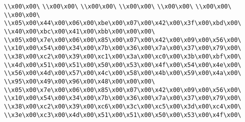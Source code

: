 \verb|\\x00\x00\|\newline
\verb|\\x00\x00\|\newline
\verb|\\x00\x00\|\newline
\verb|\\x00\x00\|\newline
\verb|\\x00\x00\|\newline
\verb|\\x00\x00\|\newline
\verb|\\x00\x00\|\newline
\verb|\\x05\x00\x44\x00\x06\x00\xbe\x00\x07\x00\x42\x00\x3f\x00\xbd\x00\|\newline
\verb|\\x40\x00\xbc\x00\x41\x00\xbb\x00\x00\x00\|\newline
\verb|\\x05\x00\x7e\x00\x06\x00\x85\x00\x07\x00\x42\x00\x09\x00\x56\x00\|\newline
\verb|\\x10\x00\x54\x00\x34\x00\x7b\x00\x36\x00\x7a\x00\x37\x00\x79\x00\|\newline
\verb|\\x38\x00\xc2\x00\x39\x00\xc1\x00\x3a\x00\xc0\x00\x3b\x00\xbf\x00\|\newline
\verb|\\x4d\x00\x51\x00\x51\x00\x50\x00\x53\x00\x4f\x00\x54\x00\x4e\x00\|\newline
\verb|\\x56\x00\x4d\x00\x57\x00\x4c\x00\x58\x00\x4b\x00\x59\x00\x4a\x00\|\newline
\verb|\\x95\x00\x49\x00\x96\x00\x48\x00\x00\x00\|\newline
\verb|\\x05\x00\x7e\x00\x06\x00\x85\x00\x07\x00\x42\x00\x09\x00\x56\x00\|\newline
\verb|\\x10\x00\x54\x00\x34\x00\x7b\x00\x36\x00\x7a\x00\x37\x00\x79\x00\|\newline
\verb|\\x38\x00\xc2\x00\x39\x00\xc6\x00\x3c\x00\xc5\x00\x3d\x00\xc4\x00\|\newline
\verb|\\x3e\x00\xc3\x00\x4d\x00\x51\x00\x51\x00\x50\x00\x53\x00\x4f\x00\|\newline
